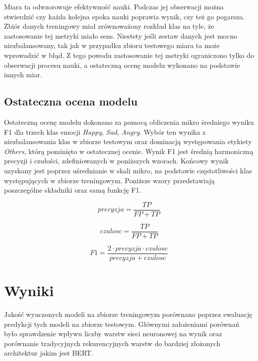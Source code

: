 Miara ta odwzorowuje efektywność nauki. Podczas jej obserwacji można stwierdzić czy każda kolejna epoka nauki poprawia wynik, czy też go pogarsza. Zbiór danych treningowy miał zrównoważony rozkład klas na tyle, że zastosowanie tej metryki miało sens. Niestety jeśli zestaw danych jest mocno niezbalansowany, tak jak w przypadku zbioru testowego miara ta może wprowadzić w błąd. Z tego powodu zastosowanie tej metryki ograniczono tylko do obserwacji procesu nauki, a ostateczną ocenę modelu wykonano na podstawie innych miar.

\subsection{Ostateczna ocena modelu}

Ostateczną ocenę modelu dokonano za pomocą obliczenia mikro średniego wyniku F1 dla trzech klas emocji \textit{Happy}, \textit{Sad}, \textit{Angry}. Wybór ten wynika z niezbalansowania klas w zbiorze testowym oraz dominacją występowania etykiety \textit{Others}, którą pominięto w ostatecznej ocenie. Wynik F1 jest średnią harmoniczną precyzji i czułości, zdefiniowanych w poniższych wzorach. Końcowy wynik uzyskany jest poprzez uśrednianie w skali mikro, na podstawie częstotliwości klas występujących w zbiorze treningowym. Poniższe wzory przedstawiają poszczególne składniki oraz samą funkcję F1.

\begin{equation}
\label{eqn:precyzja}
precyzja = \frac{TP}{FP+TP}
\end{equation}

\begin{equation}
\label{eqn:czułość}
czulosc = \frac{TP}{FP+TP}
\end{equation}

\begin{equation}
\label{eqn:f1}
F1 = \frac{2 \cdot precyzja\cdot czulosc}{precyzja + czulosc}
\end{equation}

\section{Wyniki}

Jakość wyuczonych modeli na zbiorze treningowym porównano poprzez ewaluację predykcji tych modeli na zbiorze testowym. Głównymi założeniami porównań było sprawdzenie wpływu liczby warstw sieci neuronowej na wynik oraz porównanie tradycyjnych rekurencyjnych warstw do bardziej złożonych architektur jakim jest BERT. 

